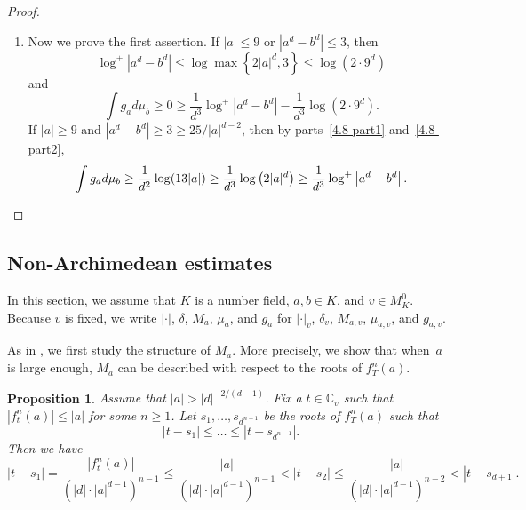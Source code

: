 \documentclass[10pt,a4paper]{amsart}
\numberwithin{equation}{section}
\theoremstyle{plain}
\newtheorem{prop}[thm]{Proposition}
\theoremstyle{definition}
\theoremstyle{remark}
\newcommand{\C}{\mathbb C}
\begin{document}
\begin{proof}
\begin{enumerate}[wide]
\item\label{4.8-part3}
Now we prove the first assertion. If $|a|\leq9$ or $|a^{d}-b^{d}|\leq3$,
then
\[
\log^{+}\left|a^{d}-b^{d}\right|\leq\log\max\left\{2|a|^{d},3\right\}\leq\log\left(2\cdot9^{d}\right)
\]
and
\[
\int g_{a}d\mu_{b}\geq0\geq\frac{1}{d^{3}}\log^{+}\left|a^{d}-b^{d}\right|-\frac{1}{d^{3}}\log\left(2\cdot9^{d}\right).
\]
If $|a|\geq9$ and $|a^{d}-b^{d}|\geq3\geq25/|a|^{d-2}$, then by
parts~\eqref{4.8-part1} and~\eqref{4.8-part2},
\[
\int g_{a}d\mu_{b}\geq\frac{1}{d^{2}}\log(13|a|)\geq\frac{1}{d^{3}}\log\left(2|a|^{d}\right)\geq\frac{1}{d^{3}}\log^{+}\left|a^{d}-b^{d}\right|.\qedhere
\]
\end{enumerate}
\end{proof}

\subsection{Non-Archimedean estimates}\label{sec4.4}

In this section, we assume that $K$ is a number field, $a,b\in K$,
and $v\in M_{K}^{0}$. Because $v$ is fixed, we write $|\cdot|$,
$\delta$, $M_{a}$, $\mu_{a}$, and $g_{a}$ for $|\cdot|_{v}$,
$\delta_{v}$, $M_{a,v}$, $\mu_{a,v}$, and $g_{a,v}$.

As in \cite[Sections 5.1 and 6.1]{DKY2}, we first study the structure
of $M_{a}$. More precisely, we show that when~$a$ is large enough,
$M_{a}$ can be described with respect to the roots of $f_{T}^{n}(a)$.

\begin{prop}\label{prop4.9}
Assume that $|a|>|d|^{-2/(d-1)}$. Fix a $t\in\C_{v}$
such that $|f_{t}^{n}(a)|\leq|a|$ for some $n\geq1$. Let $s_{1},\dots,s_{d^{n-1}}$
be the roots of $f_{T}^{n}(a)$ such that
\[
|t-s_{1}|\leq\dots\leq|t-s_{d^{n-1}}|.
\]
Then we have
\[
|t-s_{1}|=\frac{\left|f_{t}^{n}(a)\right|}{\left(|d|\cdot|a|^{d-1}\right)^{n-1}}\leq\frac{|a|}{\left(|d|\cdot|a|^{d-1}\right)^{n-1}}<|t-s_{2}|\leq\frac{|a|}{\left(|d|\cdot|a|^{d-1}\right)^{n-2}}<|t-s_{d+1}|.
\]
\end{prop}
\end{document}
